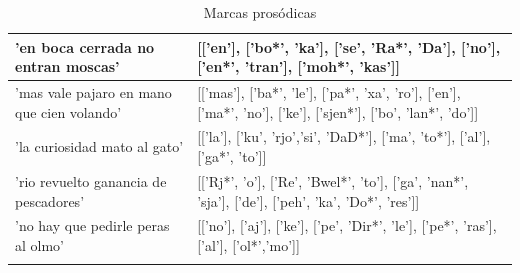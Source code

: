 \documentclass[11pt,a4paper,twoside]{tesis}
\begin{document}
\begin{longtable}{| p{} | p{} |}
'en boca cerrada no entran moscas' & [['en'], ['bo*', 'ka'], ['se', 'Ra*', 'Da'], ['no'], ['en*', 'tran'], ['moh*', 'kas']] \\ \hline
'mas vale pajaro en mano que cien volando' & [['mas'], ['ba*', 'le'], ['pa*', 'xa', 'ro'], ['en'], ['ma*', 'no'], ['ke'], ['sjen*'], ['bo', 'lan*', 'do']] \\ \hline
'la curiosidad mato al gato' & [['la'], ['ku', 'rjo','si', 'DaD*'], ['ma', 'to*'], ['al'], ['ga*', 'to']] \\ \hline
'rio revuelto ganancia de pescadores' & [['Rj*', 'o'], ['Re', 'Bwel*', 'to'], ['ga', 'nan*', 'sja'], ['de'], ['peh', 'ka', 'Do*', 'res']] \\ \hline
'no hay que pedirle peras al olmo' & [['no'], ['aj'], ['ke'], ['pe', 'Dir*', 'le'], ['pe*', 'ras'], ['al'], ['ol*','mo']] \\ \hline

\caption{Marcas prosódicas} 
\label{tab:myfirstlongtable}
\end{longtable}

\backmatter


 
\end{document}
